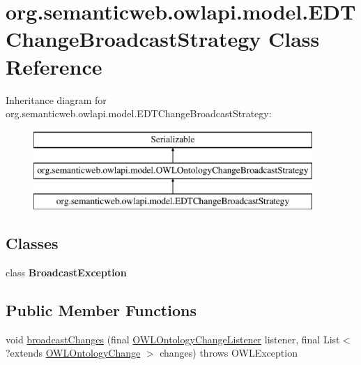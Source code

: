 \hypertarget{classorg_1_1semanticweb_1_1owlapi_1_1model_1_1_e_d_t_change_broadcast_strategy}{\section{org.\-semanticweb.\-owlapi.\-model.\-E\-D\-T\-Change\-Broadcast\-Strategy Class Reference}
\label{classorg_1_1semanticweb_1_1owlapi_1_1model_1_1_e_d_t_change_broadcast_strategy}
}
Inheritance diagram for org.\-semanticweb.\-owlapi.\-model.\-E\-D\-T\-Change\-Broadcast\-Strategy\-:\begin{figure}[H]
\begin{center}
\leavevmode
\includegraphics[height=3.000000cm]{classorg_1_1semanticweb_1_1owlapi_1_1model_1_1_e_d_t_change_broadcast_strategy}
\end{center}
\end{figure}
\subsection*{Classes}
\begin{DoxyCompactItemize}
\item 
class {\bfseries Broadcast\-Exception}
\end{DoxyCompactItemize}
\subsection*{Public Member Functions}
\begin{DoxyCompactItemize}
\item 
void \hyperlink{classorg_1_1semanticweb_1_1owlapi_1_1model_1_1_e_d_t_change_broadcast_strategy_aae90b590a35d5e0289fdb83a995e2eb7}{broadcast\-Changes} (final \hyperlink{interfaceorg_1_1semanticweb_1_1owlapi_1_1model_1_1_o_w_l_ontology_change_listener}{O\-W\-L\-Ontology\-Change\-Listener} listener, final List$<$?extends \hyperlink{classorg_1_1semanticweb_1_1owlapi_1_1model_1_1_o_w_l_ontology_change}{O\-W\-L\-Ontology\-Change} $>$ changes)  throws O\-W\-L\-Exception 
\end{DoxyCompactItemize}
